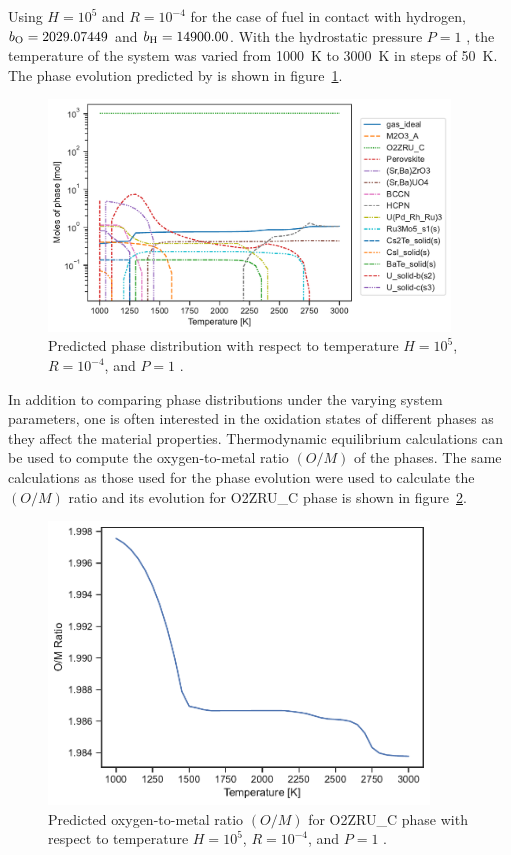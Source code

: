 Using $H = 10^5$ and $R = 10^{-4}$ for the case of fuel in contact with hydrogen, $b_{\ce{O}} = 2029.07449$ and $b_{\ce{H}} = 14900.00$. With the hydrostatic pressure $P = 1$ \si{\atmosphere}, the temperature of the system was varied from \SI{1000}{\kelvin} to \SI{3000}{\kelvin} in steps of \SI{50}{\kelvin}. The phase evolution predicted by {\GEM} is shown in figure~\ref{fig:candu_phase}. 
\begin{figure}[ht]
         \centering
         \includegraphics[width=0.95\textwidth]{figures/chapter-7/Candu_moles.pdf}
         \caption{Predicted phase distribution with respect to temperature $H = 10^5$, $R = 10^{−4}$, and $P = 1$ \si{\atmosphere}.}
     \label{fig:candu_phase}
\end{figure}

In addition to comparing phase distributions under the varying system parameters, one is often interested in the oxidation states of different phases as they affect the material properties. Thermodynamic equilibrium calculations can be used to compute the oxygen-to-metal ratio $\left(O/M\right)$ of the phases. The same calculations as those used for the phase evolution were used to calculate the $\left(O/M\right)$ ratio and its evolution for O2ZRU\_C phase is shown in figure~\ref{fig:candu_om}.
\begin{figure}[htb]
         \centering
         \includegraphics[width=0.9\textwidth]{figures/chapter-7/Candu_OM.pdf}
         \caption{Predicted oxygen-to-metal ratio $\left(O/M\right)$ for O2ZRU\_C phase with respect to temperature $H = 10^5$, $R = 10^{−4}$, and $P = 1$ \si{\atmosphere}.}
     \label{fig:candu_om}
\end{figure}


